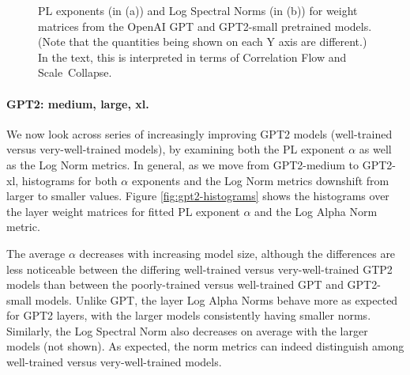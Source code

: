 \begin{figure}[htb]
    \centering
    \quad
    \caption{PL exponents 
             (in (a)) and Log Spectral Norms 
             (in (b)) for weight matrices from the OpenAI GPT and GPT2-small pretrained models.  (Note that the quantities being shown on each Y axis are different.)
             In the text, this is interpreted in terms of Correlation Flow and Scale~Collapse.
            }
    \label{fig:gpt-alpha-layers}
\end{figure}


\paragraph{GPT2: medium, large, xl.} 

We now look across series of increasingly improving GPT2 models (well-trained versus very-well-trained models), by examining both the PL exponent $\alpha$ as well as the Log Norm metrics.  
In general, as we move from GPT2-medium to GPT2-xl, histograms for both $\alpha$ exponents and the Log Norm metrics downshift from larger to smaller values. 
Figure \ref{fig:gpt2-histograms} shows the histograms over the layer weight matrices for fitted PL exponent $\alpha$ and the Log Alpha Norm metric. 

The average $\alpha$ decreases with increasing model size, although the differences are less noticeable between the differing well-trained 
versus very-well-trained GTP2 models than between the poorly-trained versus well-trained GPT and GPT2-small models.
Unlike GPT, the layer Log Alpha Norms behave more as expected for GPT2 layers, with the larger models consistently having smaller norms. 
Similarly, the Log Spectral Norm also decreases on average with the larger models (not shown).  
As expected, the norm metrics can indeed distinguish among well-trained versus very-well-trained models.


